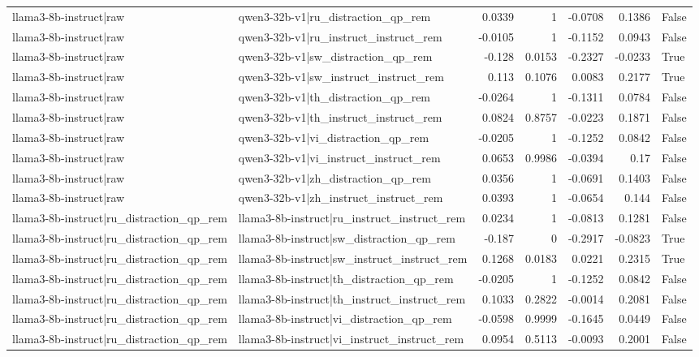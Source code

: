 \begin{table}
\begin{tabular}{l l r r r r l}
llama3-8b-instruct|raw & qwen3-32b-v1|ru_distraction_qp_rem & 0.0339 & 1 & -0.0708 & 0.1386 & False \\
llama3-8b-instruct|raw & qwen3-32b-v1|ru_instruct_instruct_rem & -0.0105 & 1 & -0.1152 & 0.0943 & False \\
llama3-8b-instruct|raw & qwen3-32b-v1|sw_distraction_qp_rem & -0.128 & 0.0153 & -0.2327 & -0.0233 & True \\
llama3-8b-instruct|raw & qwen3-32b-v1|sw_instruct_instruct_rem & 0.113 & 0.1076 & 0.0083 & 0.2177 & True \\
llama3-8b-instruct|raw & qwen3-32b-v1|th_distraction_qp_rem & -0.0264 & 1 & -0.1311 & 0.0784 & False \\
llama3-8b-instruct|raw & qwen3-32b-v1|th_instruct_instruct_rem & 0.0824 & 0.8757 & -0.0223 & 0.1871 & False \\
llama3-8b-instruct|raw & qwen3-32b-v1|vi_distraction_qp_rem & -0.0205 & 1 & -0.1252 & 0.0842 & False \\
llama3-8b-instruct|raw & qwen3-32b-v1|vi_instruct_instruct_rem & 0.0653 & 0.9986 & -0.0394 & 0.17 & False \\
llama3-8b-instruct|raw & qwen3-32b-v1|zh_distraction_qp_rem & 0.0356 & 1 & -0.0691 & 0.1403 & False \\
llama3-8b-instruct|raw & qwen3-32b-v1|zh_instruct_instruct_rem & 0.0393 & 1 & -0.0654 & 0.144 & False \\
llama3-8b-instruct|ru_distraction_qp_rem & llama3-8b-instruct|ru_instruct_instruct_rem & 0.0234 & 1 & -0.0813 & 0.1281 & False \\
llama3-8b-instruct|ru_distraction_qp_rem & llama3-8b-instruct|sw_distraction_qp_rem & -0.187 & 0 & -0.2917 & -0.0823 & True \\
llama3-8b-instruct|ru_distraction_qp_rem & llama3-8b-instruct|sw_instruct_instruct_rem & 0.1268 & 0.0183 & 0.0221 & 0.2315 & True \\
llama3-8b-instruct|ru_distraction_qp_rem & llama3-8b-instruct|th_distraction_qp_rem & -0.0205 & 1 & -0.1252 & 0.0842 & False \\
llama3-8b-instruct|ru_distraction_qp_rem & llama3-8b-instruct|th_instruct_instruct_rem & 0.1033 & 0.2822 & -0.0014 & 0.2081 & False \\
llama3-8b-instruct|ru_distraction_qp_rem & llama3-8b-instruct|vi_distraction_qp_rem & -0.0598 & 0.9999 & -0.1645 & 0.0449 & False \\
llama3-8b-instruct|ru_distraction_qp_rem & llama3-8b-instruct|vi_instruct_instruct_rem & 0.0954 & 0.5113 & -0.0093 & 0.2001 & False \\

\end{tabular}
\end{table}
